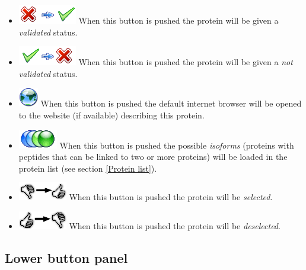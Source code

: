 \documentclass[11pt,a4paper,oneside,notitlepage]{book}
\begin{document}
\begin{itemize}
\item \includegraphics[scale=0.6, H]{setValidated.png} When this button is pushed the protein will be given a \textit{validated} status. 
\item \includegraphics[scale=0.6, H]{setNotValidated.png} When this button is pushed the protein will be given a \textit{not validated} status.
\item \includegraphics[scale=0.6, H]{homepage.png} When this button is pushed the default internet browser will be opened to the website (if available) describing this protein.
\item \includegraphics[scale=0.6, H]{isoform.png} When this button is pushed the possible \textit{isoforms} (proteins with peptides that can be linked to two or more proteins) will be loaded in the protein list (see section \ref{Protein list}).
\item \includegraphics[scale=0.6, H]{addSelection.png} When this button is pushed the protein will be \textit{selected}.
\item \includegraphics[scale=0.6, H]{deleteSelection.png} When this button is pushed the protein will be \textit{deselected}.
\end{itemize}

\subsection{Lower button panel}\label{lowerButtonPanel}
\end{document}
